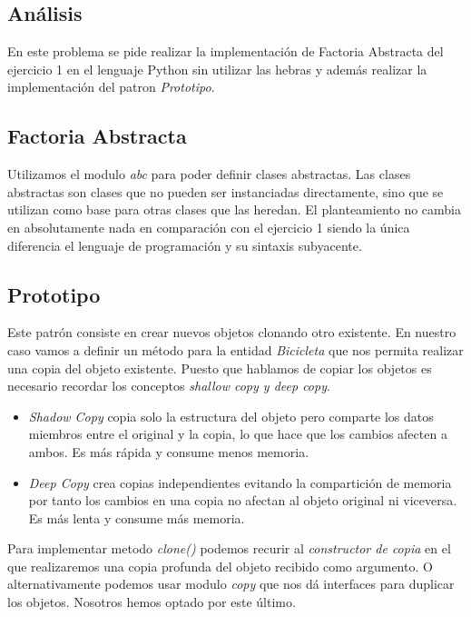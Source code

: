 \documentclass{article}
\begin{document}
\subsection{Análisis}
En este problema se pide realizar la implementación de Factoria Abstracta del ejercicio 1 en el lenguaje Python sin utilizar las hebras y además realizar la implementación del patron \textit{Prototipo}. 

\subsection{Factoria Abstracta}
Utilizamos el modulo \textit{abc} para poder definir clases abstractas. Las clases abstractas son clases que no pueden ser instanciadas directamente, sino que se utilizan como base para otras clases que las heredan. 
El planteamiento no cambia en absolutamente nada en comparación con el ejercicio 1 siendo la única diferencia el lenguaje de programación y su sintaxis subyacente.

\subsection{Prototipo}
Este patrón consiste en crear nuevos objetos clonando otro existente. En nuestro caso vamos a definir un método para la entidad \textit{Bicicleta} que nos permita realizar una copia del objeto existente. Puesto que hablamos de copiar los objetos es necesario recordar los conceptos \textit{shallow copy y deep copy}. 

\begin{itemize}
	\item \textit{Shadow Copy}  copia solo la estructura  del objeto pero comparte los datos miembros entre el original y la copia, lo que hace que los cambios afecten a ambos. Es más rápida y consume menos memoria.
	
	\item \textit{Deep Copy }crea copias independientes evitando la compartición de memoria por tanto los cambios en una copia no afectan al objeto original ni viceversa. Es más lenta y consume más memoria.
\end{itemize}

Para implementar metodo \textit{clone()} podemos recurir al \textit{constructor de copia} en el que realizaremos una copia profunda del objeto recibido como argumento. O alternativamente podemos usar modulo \textit{copy} que nos dá interfaces para duplicar los objetos. Nosotros hemos optado por este último.
\end{document}
